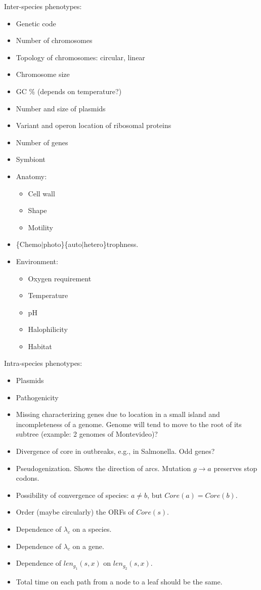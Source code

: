\documentclass[10pt,a4paper]{article}
\theoremstyle{plain} \newtheorem{Lem}{Lemma}
\begin{document}
Inter-species phenotypes:
\begin{itemize}
	\item Genetic code
	\item Number of chromosomes
	\item Topology of chromosomes: circular, linear
	\item Chromosome size
	\item GC \% (depends on temperature?)
	\item Number and size of plasmids
	\item Variant and operon location of ribosomal proteins
	\item Number of genes
	\item Symbiont
	\item Anatomy:
	\begin{itemize}
		\item Cell wall
		\item Shape
		\item Motility
	\end{itemize}
	\item \{Chemo$|$photo\}\{auto$|$hetero\}trophness.
    \item Environment:
	\begin{itemize}
		\item Oxygen requirement
		\item Temperature
		\item pH
		\item Halophilicity
		\item Habitat
	\end{itemize}
\end{itemize}


Intra-species phenotypes:
\begin{itemize}
  \item Plasmids
  \item Pathogenicity
\end{itemize}


\Questions
\begin{itemize}
\item Missing characterizing genes due to location in a small island and incompleteness of a genome.
      Genome will tend to move to the root of its subtree (example: 2 genomes of Montevideo)?
\item Divergence of core in outbreaks, e.g., in Salmonella. Odd genes?
\item Pseudogenization. Shows the direction of arcs. Mutation $g \to a$ preserves stop codons.
\item Possibility of convergence of species: $a \ne b$, but $Core(a) = Core(b)$.
\item Order (maybe circularly) the ORFs of $Core(s)$.
\item Dependence of $\lambda_c$ on a species.
\item Dependence of $\lambda_c$ on a gene.
\item Dependence of $len_{g_1}(s,x)$ on $len_{g_2}(s,x)$.
\item Total time on each path from a node to a leaf should be the same.
\end{itemize}
\end{document}
